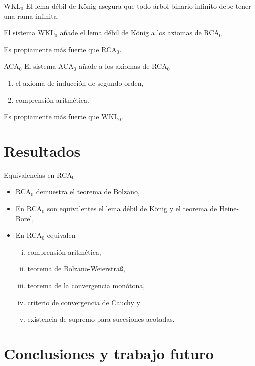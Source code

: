 \documentclass[10pt]{beamer}
\begin{document}
\begin{frame}[fragile]{WKL$_0$}
  El lema débil de König asegura que todo árbol binario infinito debe tener una rama infinita.

  El sistema WKL$_0$ añade el lema débil de König a los axiomas de RCA$_0$.

  Es propiamente más fuerte que RCA$_0$.
\end{frame}

\begin{frame}[fragile]{ACA$_0$}
  El sistema ACA$_0$ añade a los axiomas de RCA$_0$

  \begin{enumerate}
  \item el axioma de inducción de segundo orden,
  \item comprensión aritmética.
  \end{enumerate}

  Es propiamente más fuerte que WKL$_0$.
\end{frame}

\section{Resultados}

\begin{frame}[fragile]{Equivalencias en RCA$_0$}
  \begin{itemize}
  \item RCA$_0$ demuestra el teorema de Bolzano,
  \item En RCA$_0$ son equivalentes el lema débil de König y el teorema de Heine-Borel,
  \item En RCA$_0$ equivalen
    \begin{enumerate}[(i)]
    \item comprensión aritmética,
    \item teorema de Bolzano-Weierstra{\ss},
    \item teorema de la convergencia monótona,
    \item criterio de convergencia de Cauchy y
    \item existencia de supremo para sucesiones acotadas.
    \end{enumerate}
  \end{itemize}
\end{frame}

\section{Conclusiones y trabajo futuro}
\end{document}
